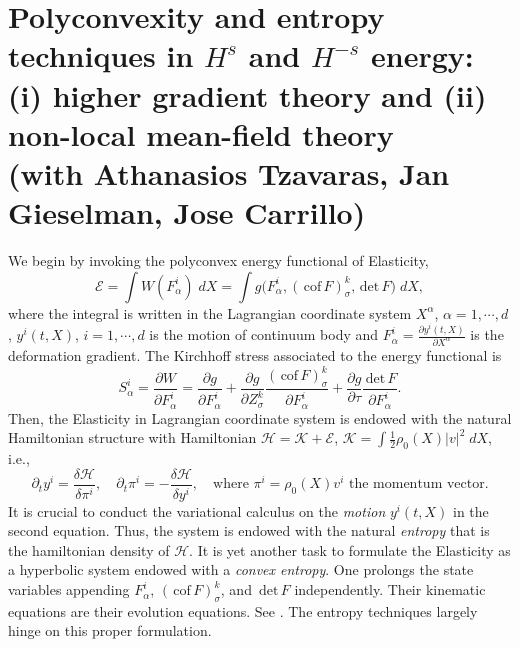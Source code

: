 \documentclass[a4paper,11pt]{article}
\def\red{\color{red}}
\def\div{\,\textrm{div}\,}
\def\cof{\,\textrm{cof}\,}
\def\det{\,\textrm{det}\,}
\def\K{\mathcal{K}}
\def\E{\mathcal{E}}
\def\H{\mathcal{H}}
\begin{document}
\section{Polyconvexity and entropy techniques in $H^s$ and $H^{-s}$ energy: (i) higher gradient theory and (ii) non-local mean-field theory \\{\small (with Athanasios Tzavaras, Jan Gieselman, Jose Carrillo)}}
We begin by invoking the polyconvex energy functional of  Elasticity,
\begin{equation}
 \mathcal{E} = \int W(F^i_\alpha) \; dX =  \int g\Big(F^i_\alpha, (\cof F)^{k}_\sigma, \det F\Big) \; dX,
\end{equation}
where the integral is written in the Lagrangian coordinate system $X^\alpha$, $\alpha=1,\cdots,d$, $y^i(t,X)$, $i=1,\cdots,d$ is the motion of continuum body and $\displaystyle F^i_\alpha = \frac{\partial y^i(t,X)}{\partial X^\alpha}$ is the deformation gradient. The Kirchhoff stress associated to the energy functional is 
\begin{equation}
 S^{i}_\alpha = \frac{\partial W}{\partial F^i_\alpha} = \frac{\partial g}{\partial F^i_\alpha} + \frac{\partial g}{\partial Z^k_\sigma}\frac{(\cof F)^{k}_\sigma}{\partial F^i_\alpha} + \frac{\partial g}{\partial \tau}\frac{\det F}{\partial F^i_\alpha}. 
\end{equation}
Then, the Elasticity in Lagrangian coordinate system 
is endowed with the natural Hamiltonian structure with Hamiltonian $\H = \K + \E$, $\displaystyle \K = \int \frac{1}{2} \rho_0(X) |v|^2 \; dX$, i.e.,
\begin{equation} \label{eq:elasticity_ham}
    \partial_t y^i = \frac{\delta \H}{\delta \pi^i},\quad 
    \partial_t \pi^i = -\frac{\delta \H}{\delta y^i}, \quad\text{where $\pi^i = \rho_0(X)v^i$ the momentum vector}.
\end{equation}
It is crucial to conduct the variational calculus on the {\it motion} $y^i(t,X)$ in the second equation. Thus, the system is endowed with the natural {\it entropy} that is the hamiltonian density of $\H$. It is yet another task to formulate the Elasticity as a hyperbolic system endowed with a {\it convex entropy}. One prolongs the state variables appending $F^i_\alpha$, $(\cof F)^{k}_\sigma$, and $\det F$ independently. Their kinematic equations are their evolution equations. See \cite{demoulini_variational_2001}. The entropy techniques largely hinge on this proper formulation.
\end{document}
